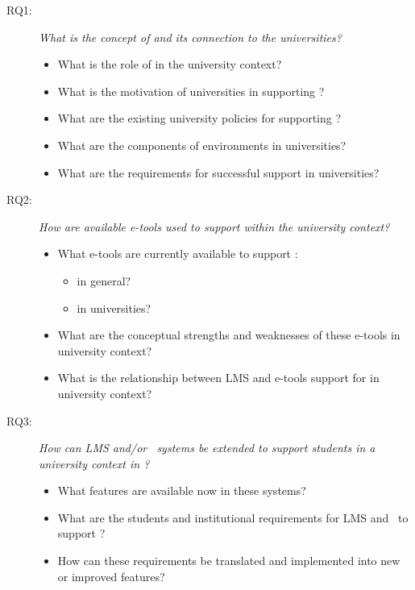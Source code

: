 \begin{description}
  \item[RQ1:] \textit{What is the concept of \LLLs and its connection to the
  universities?}
	\begin{itemize}
	  \item What is the role of \LLLs in the university context?
	  \item What is the motivation of universities in supporting \LLLsn?
  	  \item What are the existing university policies for supporting \LLLsn?
      \item What are the components of \LLLs environments in universities?
      \item What are the requirements for successful \LLLs support in
   universities?
	\end{itemize} 
	
   \item[RQ2:] \textit{How are available e-tools used to support \LLLs within
   the university context?}
	\begin{itemize}
		\item What e-tools are currently available to support \LLLsn:
			\begin{itemize}
				\item in general?
				\item in universities?
			\end{itemize}
		\item What are the conceptual strengths and weaknesses of these e-tools in
		university context?
		\item What is the relationship between LMS and e-tools support for \LLLs in
		university context?
	\end{itemize}

	\item[RQ3:] \textit{How can LMS and/or \ep~systems be extended to support
	students in a university context in \LLLsn?}
	\begin{itemize}
		\item What features are available now in these systems?
		\item What are the students and institutional requirements for LMS and
		\ep~to support \LLLsn?
		\item How can these requirements be translated and implemented into new or
		improved features?
	\end{itemize}


\end{description}
